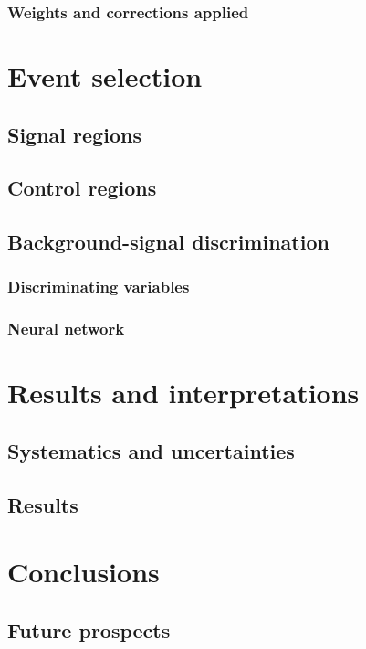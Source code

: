 \documentclass[a4paper, 10pt, openright]{report}
\begin{document}
\subsection{Weights and corrections applied}

\chapter{Event selection} \label{chapter:Selection}
\section{Signal regions}
\section{Control regions}
\section{Background-signal discrimination} \label{section:Discrimination}
\subsection{Discriminating variables}
\subsection{Neural network}

\chapter{Results and interpretations} \label{chapter:FinalResults}
\section{Systematics and uncertainties}
\section{Results}

\chapter{Conclusions} \label{chapter:Conclusion}
\section{Future prospects}

\begin{appendices}

\end{appendices}
\end{document}
